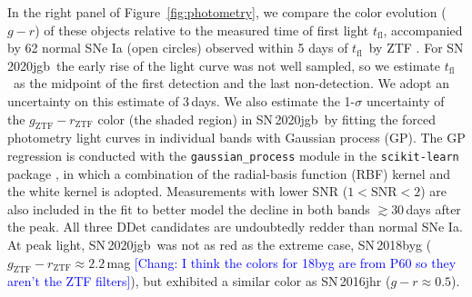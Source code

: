 \documentclass[twocolumn]{aastex631}
\newcommand{\sn}{SN\,2020jgb}
\newcommand{\tfl}{$t_\mathrm{fl}$}
\newcommand{\chang}[1]{\textcolor{blue}{[Chang: #1]}}
\begin{document}
In the right panel of Figure~\ref{fig:photometry}, we compare the color evolution ($g-r$) of these objects relative to the measured time of first light \tfl, accompanied by 62 normal SNe Ia (open circles) observed within 5 days of \tfl\ by ZTF \citep[from][]{Bulla2020}. For \sn\, the early rise of the light curve was not well sampled, so we estimate \tfl\ as the midpoint of the first detection and the last non-detection. We adopt an uncertainty on this estimate of 3\,days. We also estimate the 1-$\sigma$ uncertainty of the $g_\mathrm{ZTF}-r_\mathrm{ZTF}$ color (the shaded region) in \sn\ by fitting the forced photometry light curves in individual bands with Gaussian process (GP). The GP regression is conducted with the \texttt{gaussian\_process} module in the \texttt{scikit-learn} package \citep{scikit-learn}, in which a combination of the radial-basis function (RBF) kernel and the white kernel is adopted. Measurements with lower SNR ($1<\mathrm{SNR}<2$) are also included in the fit to better model the decline in both bands $\gtrsim$30\,days after the peak. All three DDet candidates are undoubtedly redder than normal SNe Ia. At peak light, \sn\ was not as red as the extreme case, SN\,2018byg ($g_\mathrm{ZTF}-r_\mathrm{ZTF}\approx2.2$\,mag \chang{I think the colors for 18byg are from P60 so they aren't the ZTF filters}), but exhibited a similar color as SN\,2016jhr ($g-r\approx0.5$).
\end{document}
